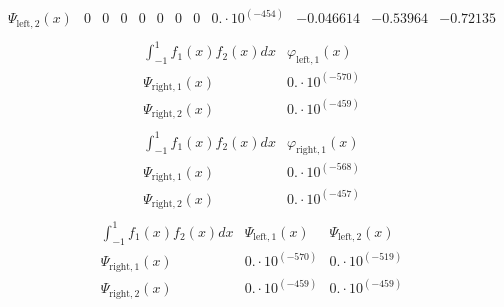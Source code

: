 \documentclass{article}
\begin{document}
\begin{landscape}
$$\begin{array}{l|lllllllllll}
\Psi_{\text{left},2}(x) & 0 & 0 & 0 & 0 & 0 & 0 & 0 & 0.\cdot 10^{(-454)} & -0.046614 & -0.53964 & -0.72135 \\ 
\end{array} $$ 
$$ \begin{array}{l|l}
\int_{-1}^1 f_1(x)f_2(x) dx& \varphi_{\text{left},1}(x) \\ \hline 
 \Psi_{\text{right},1}(x) & 0.\cdot 10^{(-570)} \\ 
\Psi_{\text{right},2}(x) & 0.\cdot 10^{(-459)} \\ 
\end{array} $$ 
$$ \begin{array}{l|l}
\int_{-1}^1 f_1(x)f_2(x) dx& \varphi_{\text{right},1}(x) \\ \hline 
 \Psi_{\text{right},1}(x) & 0.\cdot 10^{(-568)} \\ 
\Psi_{\text{right},2}(x) & 0.\cdot 10^{(-457)} \\ 
\end{array} $$ 
$$ \begin{array}{l|ll}
\int_{-1}^1 f_1(x)f_2(x) dx& \Psi_{\text{left},1}(x)& \Psi_{\text{left},2}(x) \\ \hline 
 \Psi_{\text{right},1}(x) & 0.\cdot 10^{(-570)} & 0.\cdot 10^{(-519)} \\ 
\Psi_{\text{right},2}(x) & 0.\cdot 10^{(-459)} & 0.\cdot 10^{(-459)} \\ 
\end{array} $$ 
\end{landscape}
\end{document}
